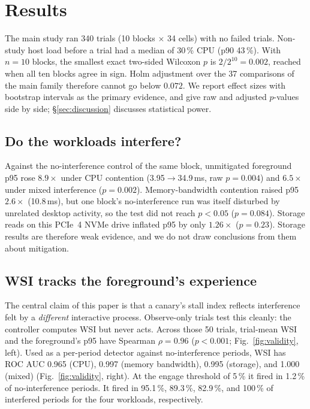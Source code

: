 \section{Results}
\label{sec:results}

The main study ran 340 trials (10 blocks $\times$ 34 cells) with no failed trials. Non-study host load before a trial had a median of 30\,\% CPU (p90 43\,\%). With $n=10$ blocks, the smallest exact two-sided Wilcoxon $p$ is $2/2^{10}=0.002$, reached when all ten blocks agree in sign. Holm adjustment over the 37 comparisons of the main family therefore cannot go below $0.072$. We report effect sizes with bootstrap intervals as the primary evidence, and give raw and adjusted $p$-values side by side; \S\ref{sec:discussion} discusses statistical power.

\subsection{Do the workloads interfere?}
Against the no-interference control of the same block, unmitigated foreground p95 rose $8.9\times$ under CPU contention (3.95$\rightarrow$34.9\,ms, raw $p=0.004$) and $6.5\times$ under mixed interference ($p=0.002$). Memory-bandwidth contention raised p95 $2.6\times$ (10.8\,ms), but one block's no-interference run was itself disturbed by unrelated desktop activity, so the test did not reach $p<0.05$ ($p=0.084$). Storage reads on this PCIe~4 NVMe drive inflated p95 by only $1.26\times$ ($p=0.23$). Storage results are therefore weak evidence, and we do not draw conclusions from them about mitigation.

\subsection{WSI tracks the foreground's experience}
The central claim of this paper is that a canary's stall index reflects interference felt by a \emph{different} interactive process. Observe-only trials test this cleanly: the controller computes WSI but never acts. Across those 50 trials, trial-mean WSI and the foreground's p95 have Spearman $\rho=0.96$ ($p<0.001$; Fig.~\ref{fig:validity}, left). Used as a per-period detector against no-interference periods, WSI has ROC AUC 0.965 (CPU), 0.997 (memory bandwidth), 0.995 (storage), and 1.000 (mixed) (Fig.~\ref{fig:validity}, right). At the engage threshold of 5\,\% it fired in 1.2\,\% of no-interference periods. It fired in 95.1\,\%, 89.3\,\%, 82.9\,\%, and 100\,\% of interfered periods for the four workloads, respectively.

